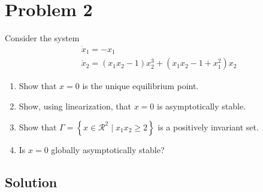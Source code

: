\section*{Problem 2}

Consider the system
\begin{align*}
     &
    \dot{x}_{1}=-x_{1}
    \\ &
    \dot{x}_{2}=\left(x_{1} x_{2}-1\right) x_{2}^{3}+\left(x_{1} x_{2}-1+x_{1}^{2}\right) x_{2}
\end{align*}
\begin{enumerate}[label= (\alph*)]
    \item Show that \( x=0 \) is the unique equilibrium point.
    \item Show, using linearization, that \( x=0 \) is asymptotically stable.
    \item Show that \( \Gamma=\left \{ x \in \mathcal{R}^{2} \mid x_{1} x_{2} \geq 2\right \} \) is a positively invariant set.
    \item Is \( x=0 \) globally asymptotically stable?
\end{enumerate}

\subsection*{Solution}
